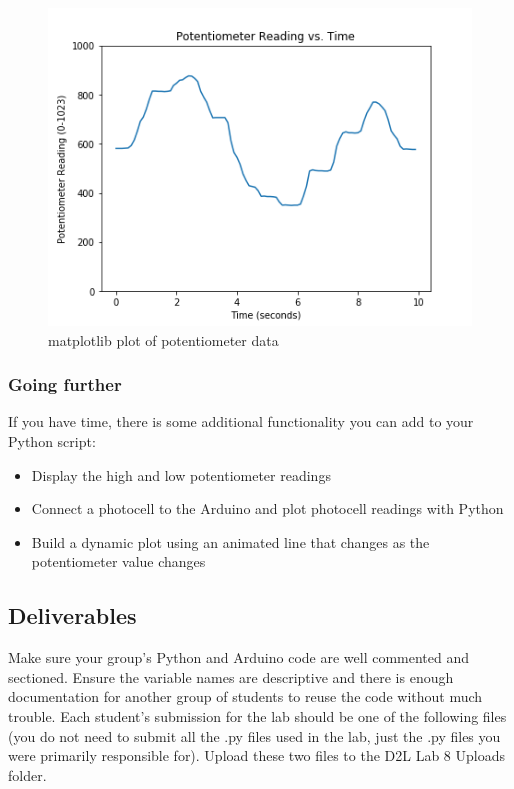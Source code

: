\documentclass[11pt]{article}
\makeatletter
\def\maxwidth{\ifdim\Gin@nat@width>\linewidth\linewidth
    \else\Gin@nat@width\fi}
\let\Oldincludegraphics\includegraphics
\renewcommand{\includegraphics}[1]{\Oldincludegraphics[width=.8\maxwidth]{#1}}
\makeatother
\begin{document}
\begin{figure}
\centering
\includegraphics{images/potentiometer_reading.png}
\caption{matplotlib plot of potentiometer data}
\end{figure}

    \hypertarget{going-further}{%
\subsubsection{Going further}\label{going-further}}

If you have time, there is some additional functionality you can add to
your Python script:

\begin{itemize}
\item
  Display the high and low potentiometer readings
\item
  Connect a photocell to the Arduino and plot photocell readings with
  Python
\item
  Build a dynamic plot using an animated line that changes as the
  potentiometer value changes
\end{itemize}

    \hypertarget{deliverables}{%
\subsection{Deliverables}\label{deliverables}}

Make sure your group's Python and Arduino code are well commented and
sectioned. Ensure the variable names are descriptive and there is enough
documentation for another group of students to reuse the code without
much trouble. Each student's submission for the lab should be one of the
following files (you do not need to submit all the .py files used in the
lab, just the .py files you were primarily responsible for). Upload
these two files to the D2L Lab 8 Uploads folder.
\end{document}
